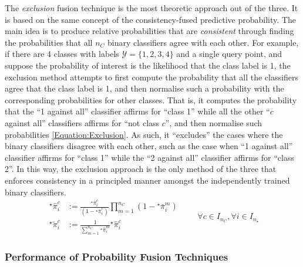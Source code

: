 				
					The \textit{exclusion} fusion technique is the most theoretic approach out of the three. It is based on the same concept of the consistency-fused predictive probability. The main idea is to produce relative probabilities that are \textit{consistent} through finding the probabilities that all $n_{C}$ binary classifiers agree with each other. For example, if there are 4 classes with labels $\mathcal{Y} = \{1, 2, 3, 4\}$ and a single query point, and suppose the probability of interest is the likelihood that the class label is 1, the exclusion method attempts to first compute the probability that all the classifiers agree that the class label is 1, and then normalise such a probability with the corresponding probabilities for other classes. That is, it computes the probability that the ``1 against all'' classifier affirms for ``class 1'' while all the other ``$c$ against all'' classifiers affirms for ``not class $c$'', and then normalise such probabilities \eqref{Equation:Exclusion}. As such, it ``excludes'' the cases where the binary classifiers disagree with each other, such as the case when ``1 against all'' classifier affirms for ``class 1'' while the ``2 against all'' classifier affirms for ``class 2''. In this way, the exclusion approach is the only method of the three that enforces consistency in a principled manner amongst the independently trained binary classifiers. \begin{equation}
						\begin{aligned}
							{^{\star}}\hat{\pi}^{c}_{i} &:= \frac{{^{\star}}\bar{\pi}^{c}_{i}}{(1 - {^{\star}}\bar{\pi}^{c}_{i})} \prod_{m = 1}^{n_{C}} (1 - {^{\star}}\bar{\pi}^{m}_{i}) \\
							{^{\star}}\tilde{\pi}^{c}_{i} &:= \frac{1}{\sum_{m = 1}^{n_{C}} {^{\star}}\hat{\pi}^{m}_{i}} {^{\star}}\hat{\pi}^{c}_{i} 
						\end{aligned} \qquad \forall c \in I_{n_{C}}, \forall i \in I_{n_{\star}}
					\label{Equation:Exclusion}
					\end{equation}
				
			\subsubsection{Performance of Probability Fusion Techniques}
			\label{BenthicHabitatMapping:Classification:FusionPerformance}
				
